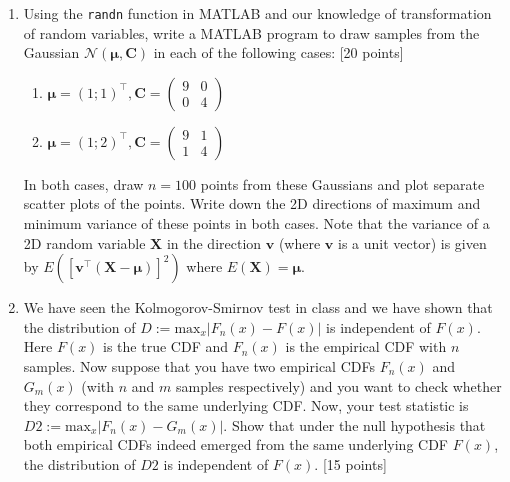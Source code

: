 \documentclass[11pt]{article}
\begin{document}
\begin{enumerate}
\item Using the \texttt{randn} function in MATLAB and our knowledge of transformation of random variables, write a MATLAB program to draw samples from the Gaussian $\mathcal{N}(\boldsymbol{\mu}, \boldsymbol{C})$ in each of the following cases: \textsf{[20 points]}
\begin{enumerate}
\item $\boldsymbol{\mu} = (1 ; 1)^{\top}, \boldsymbol{C} = \begin{pmatrix}
9 & 0\\
0 & 4
\end{pmatrix}$
\item $\boldsymbol{\mu} = (1 ; 2)^{\top}, \boldsymbol{C} = \begin{pmatrix}
9 & 1\\
1 & 4
\end{pmatrix}$
\end{enumerate}
In both cases, draw $n = 100$ points from these Gaussians and plot separate scatter plots of the points. Write down the 2D directions of maximum and minimum variance of these points in both cases. Note that the variance of a 2D random variable $\boldsymbol{X}$ in the direction $\boldsymbol{v}$ (where $\boldsymbol{v}$ is a unit vector) is given by $E([\boldsymbol{v}^{\top}(\boldsymbol{X}-\boldsymbol{\mu})]^2)$ where $E(\boldsymbol{X}) = \boldsymbol{\mu}$. 

\item We have seen the Kolmogorov-Smirnov test in class and we have shown that the distribution of $D:= \text{max}_x |F_n(x)-F(x)|$ is independent of $F(x)$. Here $F(x)$ is the true CDF and $F_n(x)$ is the empirical CDF with $n$ samples. Now suppose that you have two empirical CDFs $F_n(x)$ and $G_m(x)$ (with $n$ and $m$ samples respectively) and you want to check whether they correspond to the same underlying CDF. Now, your test statistic is $D2 := \text{max}_x |F_n(x)-G_m(x)|$. Show that under the null hypothesis that both empirical CDFs indeed emerged from the same underlying CDF $F(x)$, the distribution of $D2$ is independent of $F(x)$. \textsf{[15 points]}


\end{enumerate}
\end{document}
